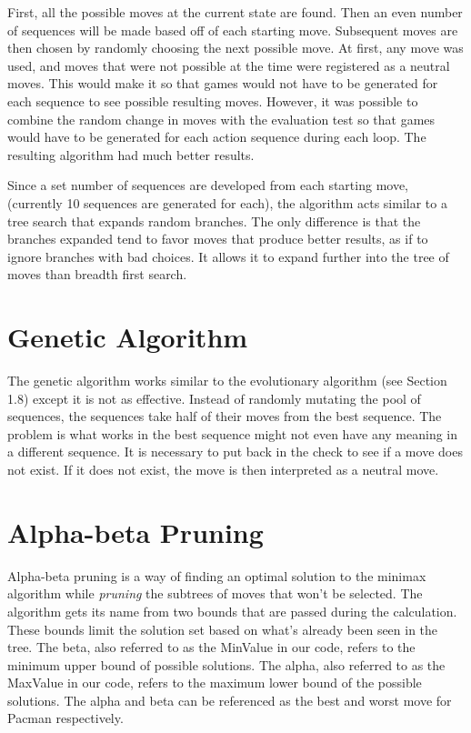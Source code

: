 \documentclass[a4paper,oneside,10pt]{report}
\begin{document}
First, all the possible moves at the current state are found. Then an even number of sequences will be made based off of each starting move. Subsequent moves are then chosen by randomly choosing the next possible move. At first, any move was used, and moves that were not possible at the time were registered as a neutral moves. This would make it so that games would not have to be generated for each sequence to see possible resulting moves. However, it was possible to combine the random change in moves with the evaluation test so that games would have to be generated for each action sequence during each loop. The resulting algorithm had much better results.

Since a set number of sequences are developed from each starting move, (currently 10 sequences are generated for each), the algorithm acts similar to a tree search that expands random branches. The only difference is that the branches expanded tend to favor moves that produce better results, as if to ignore branches with bad choices. It allows it to expand further into the tree of moves than breadth first search.

\section{Genetic Algorithm}\label{genetic}

The genetic algorithm works similar to the evolutionary algorithm (see Section 1.8) except it is not as effective. Instead of randomly mutating the pool of sequences, the sequences take half of their moves from the best sequence. The problem is what works in the best sequence might not even have any meaning in a different sequence. It is necessary to put back in the check to see if a move does not exist. If it does not exist, the move is then interpreted as a neutral move. 

\section{Alpha-beta Pruning}\label{alphabeta}

Alpha-beta pruning is a way of finding an optimal solution to the minimax algorithm while \textit{pruning} the subtrees of moves that won't be selected. The algorithm gets its name from two bounds that are passed during the calculation. These bounds limit the solution set based on what's already been seen in the tree. The beta, also referred to as the MinValue in our code, refers to the minimum upper bound of possible solutions. The alpha, also referred to as the MaxValue in our code, refers to the maximum lower bound of the possible solutions. The alpha and beta can be referenced as the best and worst move for Pacman respectively. 
\end{document}
